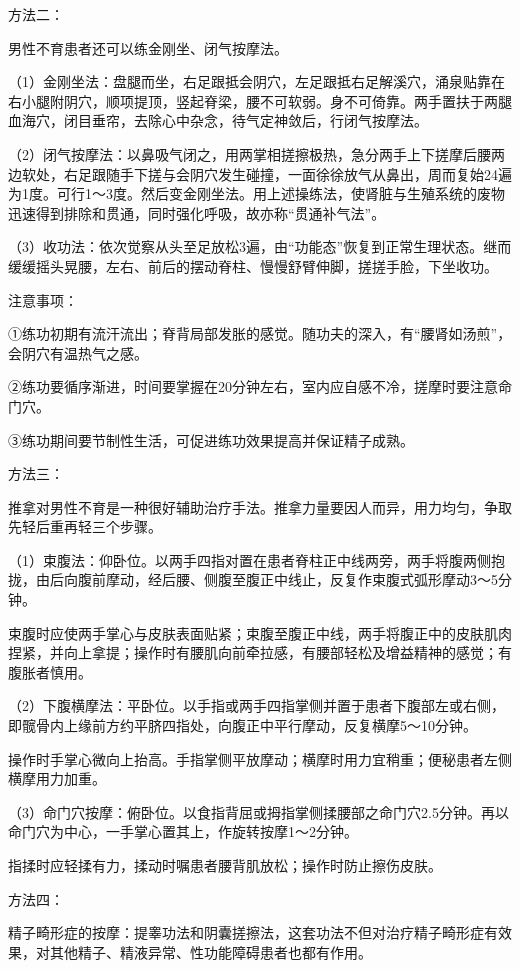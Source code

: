 \documentclass[12pt,UTF8,openany]{ctexbook}
\begin{document}
方法二：

男性不育患者还可以练金刚坐、闭气按摩法。

（1）金刚坐法：盘腿而坐，右足跟抵会阴穴，左足跟抵右足解溪穴，涌泉贴靠在右小腿附阴穴，顺项提顶，竖起脊梁，腰不可软弱。身不可倚靠。两手置扶于两腿血海穴，闭目垂帘，去除心中杂念，待气定神敛后，行闭气按摩法。

（2）闭气按摩法：以鼻吸气闭之，用两掌相搓擦极热，急分两手上下搓摩后腰两边软处，右足跟随手下搓与会阴穴发生碰撞，一面徐徐放气从鼻出，周而复始24遍为1度。可行1～3度。然后变金刚坐法。用上述操练法，使肾脏与生殖系统的废物迅速得到排除和贯通，同时强化呼吸，故亦称“贯通补气法”。

（3）收功法：依次觉察从头至足放松3遍，由“功能态”恢复到正常生理状态。继而缓缓摇头晃腰，左右、前后的摆动脊柱、慢慢舒臂伸脚，搓搓手脸，下坐收功。

注意事项：

①练功初期有流汗流出；脊背局部发胀的感觉。随功夫的深入，有“腰肾如汤煎”，会阴穴有温热气之感。

②练功要循序渐进，时间要掌握在20分钟左右，室内应自感不冷，搓摩时要注意命门穴。

③练功期间要节制性生活，可促进练功效果提高并保证精子成熟。

方法三：

推拿对男性不育是一种很好辅助治疗手法。推拿力量要因人而异，用力均匀，争取先轻后重再轻三个步骤。

（1）束腹法：仰卧位。以两手四指对置在患者脊柱正中线两旁，两手将腹两侧抱拢，由后向腹前摩动，经后腰、侧腹至腹正中线止，反复作束腹式弧形摩动3～5分钟。

束腹时应使两手掌心与皮肤表面贴紧；束腹至腹正中线，两手将腹正中的皮肤肌肉捏紧，并向上拿提；操作时有腰肌向前牵拉感，有腰部轻松及增益精神的感觉；有腹胀者慎用。

（2）下腹横摩法：平卧位。以手指或两手四指掌侧并置于患者下腹部左或右侧，即髋骨内上缘前方约平脐四指处，向腹正中平行摩动，反复横摩5～10分钟。

操作时手掌心微向上抬高。手指掌侧平放摩动；横摩时用力宜稍重；便秘患者左侧横摩用力加重。

（3）命门穴按摩：俯卧位。以食指背屈或拇指掌侧揉腰部之命门穴2.5分钟。再以命门穴为中心，一手掌心置其上，作旋转按摩1～2分钟。

指揉时应轻揉有力，揉动时嘱患者腰背肌放松；操作时防止擦伤皮肤。

方法四：

精子畸形症的按摩：提睾功法和阴囊搓擦法，这套功法不但对治疗精子畸形症有效果，对其他精子、精液异常、性功能障碍患者也都有作用。
\end{document}
